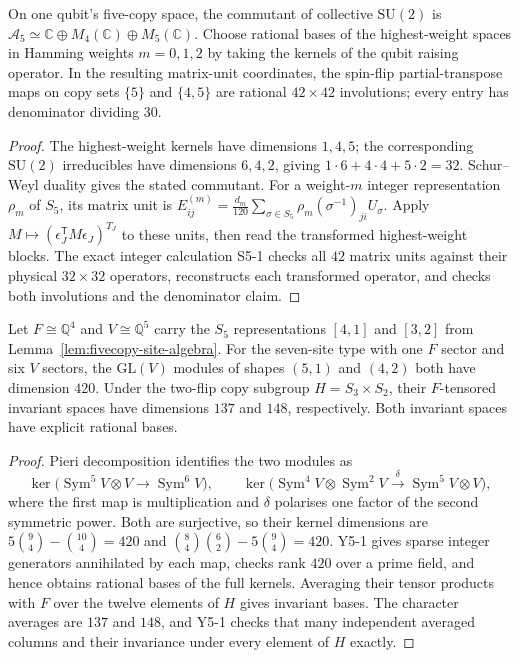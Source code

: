 \begin{lemma}\label{lem:fivecopy-site-algebra}
On one qubit's five-copy space, the commutant of collective $\mathrm{SU}(2)$ is
$\mathcal A_5\simeq\mathbb C\oplus M_4(\mathbb C)\oplus M_5(\mathbb C)$.
Choose rational bases of the highest-weight spaces in Hamming weights
$m=0,1,2$ by taking the kernels of the qubit raising operator.  In the
resulting matrix-unit coordinates, the spin-flip partial-transpose maps
on copy sets $\{5\}$ and $\{4,5\}$ are rational $42\times42$ involutions;
every entry has denominator dividing $30$.
\end{lemma}
\begin{proof}
The highest-weight kernels have dimensions $1,4,5$; the corresponding
$\mathrm{SU}(2)$ irreducibles have dimensions $6,4,2$, giving $1\cdot6+4\cdot4+5\cdot2=32$.
Schur--Weyl duality gives the stated commutant.  For a weight-$m$ integer
representation $\rho_m$ of $S_5$, its matrix unit is
$E^{(m)}_{ij}=\frac{d_m}{120}\sum_{\sigma\in S_5}
\rho_m(\sigma^{-1})_{ji}U_\sigma$.
Apply $M\mapsto (\epsilon_J^{\mathsf T}M\epsilon_J)^{T_J}$ to these units,
then read the transformed highest-weight blocks.  The exact integer
calculation S5-1 checks all $42$ matrix units against their physical
$32\times32$ operators, reconstructs each transformed operator, and checks
both involutions and the denominator claim.
\end{proof}

\begin{lemma}
\label{lem:fivecopy-young-blocks}
Let $F\cong\mathbb Q^4$ and $V\cong\mathbb Q^5$ carry the $S_5$
representations $[4,1]$ and $[3,2]$ from Lemma~\ref{lem:fivecopy-site-algebra}.
For the seven-site type with one $F$ sector and six $V$ sectors, the
$\mathrm{GL}(V)$ modules of shapes $(5,1)$ and $(4,2)$ both have dimension
$420$.  Under the two-flip copy subgroup $H=S_3\times S_2$, their
$F$-tensored invariant spaces have dimensions $137$ and $148$,
respectively.  Both invariant spaces have explicit rational bases.
\end{lemma}
\begin{proof}
Pieri decomposition identifies the two modules as
\[
 \ker\bigl(\operatorname{Sym}^5V\otimes V\to\operatorname{Sym}^6V\bigr),
 \qquad
 \ker\bigl(\operatorname{Sym}^4V\otimes\operatorname{Sym}^2V
       \xrightarrow{\delta}\operatorname{Sym}^5V\otimes V\bigr),
\]
where the first map is multiplication and $\delta$ polarises one factor
of the second symmetric power.  Both are surjective, so their kernel
dimensions are $5\binom94-\binom{10}4=420$ and
$\binom84\binom62-5\binom94=420$.
Y5-1 gives sparse integer generators annihilated by each map, checks
rank $420$ over a prime field, and hence obtains rational bases of the
full kernels.  Averaging their tensor products with $F$ over the twelve
elements of $H$ gives invariant bases.  The character averages are
$137$ and $148$, and Y5-1 checks that many independent averaged columns
and their invariance under every element of $H$ exactly.
\end{proof}

